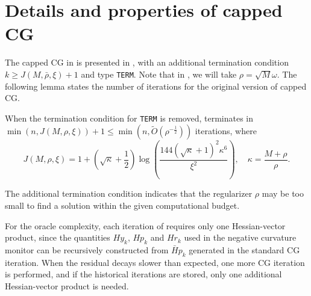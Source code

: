 
\section{Details and properties of capped CG} \label{sec:appendix/capped-cg}



The capped CG in \citet{royer2020newton} is presented in , with an additional termination condition $k \geq J(M, \bar\rho, \xi) + 1$ and type \texttt{TERM}. 
Note that in , we will take $\rho = \sqrt M \omega$. The following lemma states the number of iterations for the original version of capped CG.
\begin{lemma}
    \label{lem:capped-cg-iteration-complexity}
    When the termination condition for \texttt{TERM} is removed,  terminates in $\min(n, J(M, \rho, \xi)) + 1 \leq \min(n, \tilde O(\rho^{-\frac{1}{2}}))$ iterations, where
    \begin{equation}
    \label{eqn:capped-cg-hessvec-evals}
    J(M, \rho, \xi) 
    = 1 + \left( \sqrt \kappa + \frac{1}{2} \right) \log \left( \frac{144\left( \sqrt \kappa + 1 \right)^2 \kappa^6}{\xi^2} \right),
    \quad 
    \kappa = \frac{M + \rho}{\rho}
    .
\end{equation}
\end{lemma}
The additional termination condition indicates that the regularizer $\rho$ may be too small to find a solution within the given computational budget. 

For the oracle complexity, each iteration of  requires only one Hessian-vector product, since the quantities $H y_k$, $H p_k$ and $H r_k$ used in the negative curvature monitor can be recursively constructed from $\bar H p_k$ generated in the standard CG iteration.
When the residual decays slower than expected, one more CG iteration is performed, and if the historical iterations are stored, only one additional Hessian-vector product is needed. 

